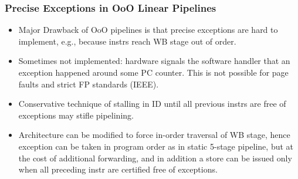 \documentclass{beamer}
\newcommand{\emp}[1]{\textcolor{DikuRed}{ #1}}
\begin{document}
\begin{frame}[fragile,t]
\frametitle{Precise Exceptions in OoO Linear Pipelines}

\begin{scriptsize}
\begin{itemize}
\item \emp{Major Drawback} of OoO pipelines is that precise exceptions are hard
            to implement, e.g., because instrs reach WB stage out of order.
            
\item \emp{Sometimes not implemented}: hardware signals the software handler that
            an exception happened around some PC counter. This is not possible
            for page faults and strict FP standards (IEEE).\smallskip
\item Conservative technique of stalling in ID until all previous instrs
        are free of exceptions may stifle pipelining.\smallskip

\item Architecture can be modified to force in-order traversal of WB stage,
        hence exception can be taken in program order as in static 5-stage 
        pipeline, but at the cost of additional forwarding, and in addition
        a store can be issued only when all preceding instr are certified 
        free of exceptions. 
\end{itemize}

\end{scriptsize}
\end{frame}
\end{document}
